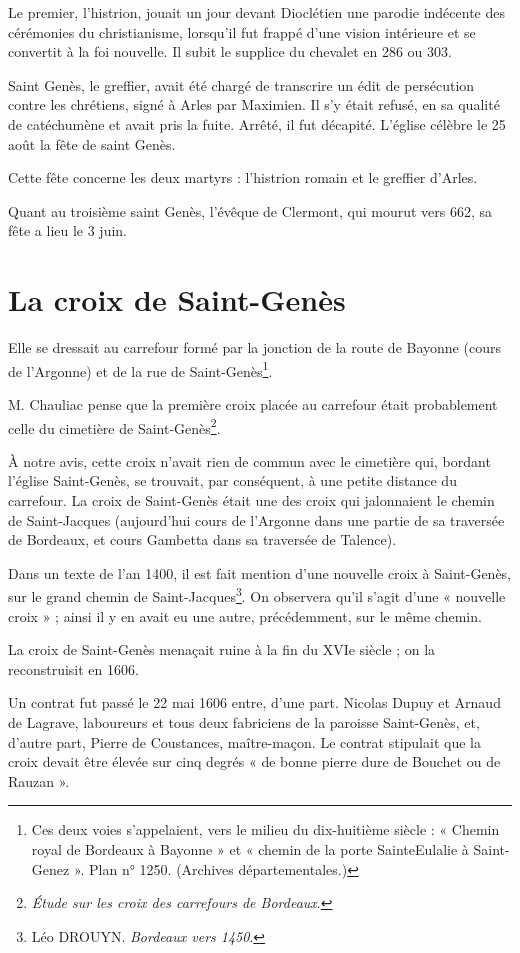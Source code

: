 \documentclass[a4paper,11pt]{book}
\begin{document}
Le premier, l'histrion, jouait un jour devant Dioclétien une parodie indécente des cérémonies du christianisme, lorsqu'il fut frappé d'une vision intérieure et se convertit à la foi nouvelle. Il subit le supplice du chevalet en 286 ou 303.

Saint Genès, le greffier, avait été chargé de transcrire un édit de persécution contre les chrétiens, signé à Arles par Maximien. Il s'y était refusé, en sa qualité de catéchumène et avait pris la fuite. Arrêté, il fut décapité. L'église célèbre le 25 août la fête de saint Genès.

Cette fête concerne les deux martyrs : l'histrion romain et le greffier d'Arles.

Quant au troisième saint Genès, l'évêque de Clermont, qui mourut vers 662, sa fête a lieu le 3 juin.

\section{La croix de Saint-Genès}

Elle se dressait au carrefour formé par la jonction de la route de Bayonne (cours de l'Argonne) et de la rue de Saint-Genès\footnote{Ces deux voies s'appelaient, vers le milieu du dix-huitième siècle : « Chemin royal de Bordeaux à Bayonne » et « chemin de la porte SainteEulalie à Saint-Genez ». Plan n° 1250. (Archives départementales.)}.

M. Chauliac pense que la première croix placée au carrefour était probablement celle du cimetière de Saint-Genès\footnote{\textit{Étude sur les croix des carrefours de Bordeaux}.}.

À notre avis, cette croix n'avait rien de commun avec le cimetière qui, bordant l'église Saint-Genès, se trouvait, par conséquent, à une petite distance du carrefour. La croix de Saint-Genès était une des croix qui jalonnaient le chemin de Saint-Jacques (aujourd'hui cours de l'Argonne dans une partie de sa traversée de Bordeaux, et cours Gambetta dans sa traversée de Talence).

Dans un texte de l'an 1400, il est fait mention d'une nouvelle croix à Saint-Genès, sur le grand chemin de Saint-Jacques\footnote{Léo DROUYN. \textit{Bordeaux vers 1450}.}. On observera qu'il s'agit d'une « nouvelle croix » ; ainsi il y en avait eu une autre, précédemment, sur le même chemin.

La croix de Saint-Genès menaçait ruine à la fin du XVIe siècle ; on la reconstruisit en 1606.

Un contrat fut passé le 22 mai 1606 entre, d'une part. Nicolas Dupuy et Arnaud de Lagrave, laboureurs et tous deux fabriciens de la paroisse Saint-Genès, et, d'autre part, Pierre de Coustances, maître-maçon. Le contrat stipulait que la croix devait être élevée sur cinq degrés « de bonne pierre dure de Bouchet ou de Rauzan ».
\end{document}
